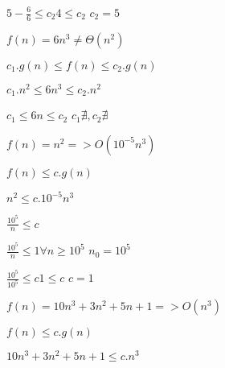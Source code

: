 \vspace{0.15cm}
\hspace{7.75cm}\(5 - \frac {6}{6} \leq c_2\)\quad \(4 \leq c_2\)\hspace{0.35cm} \(\boxed{c_2 = 5}\)

\vspace{1cm}
\(f(n) = 6n^3 \neq \Theta(n^2)\)
 
\vspace{0.5cm} 
\hspace{8.25cm}\( c_1.g(n) \leq f(n) \leq c_2.g(n)\)

\vspace{0.15cm}
\hspace{8.5cm}\( c_1.n^2 \leq 6n^3 \leq c_2.n^2\)

\vspace{0.15cm}
\hspace{9cm}\(c_1 \leq 6n \leq c_2\) \hspace{3cm} \(c_1 \nexists , c_2 \nexists\)

\vspace{1cm}
\(f(n) = n^2 => O(10^{-5}n^3)\)
 
\vspace{0.5cm} 
\hspace{9cm}\(f(n) \leq c.g(n)\)

\vspace{0.15cm}
\hspace{9cm}\(n^2 \leq c.10^{-5}n^3\)

\vspace{0.15cm}
\hspace{9.25cm}\(\frac{10^{5}}{n} \leq c\) 

\vspace{0.15cm}
\hspace{7.75cm}\(\frac{10^{5}}{n} \leq 1\)\quad \quad \(\forall n \geq 10^{5}\) \quad \(\boxed{n_0 = 10^{5}}\)

\vspace{0.15cm}
\hspace{8.25cm}\(\frac {10^{5}}{10^{5}} \leq c\)\quad \(1 \leq c\)\hspace{0.5cm} \(\boxed{c = 1}\)

\newpage
\(f(n) = 10n^3 + 3n^2 + 5n + 1  => O(n^3)\)
 
\vspace{0.5cm} 
\hspace{9cm}\(f(n) \leq c.g(n)\)

\vspace{0.15cm}
\hspace{8cm}\(10n^3 + 3n^2 + 5n + 1 \leq c.n^3\)

